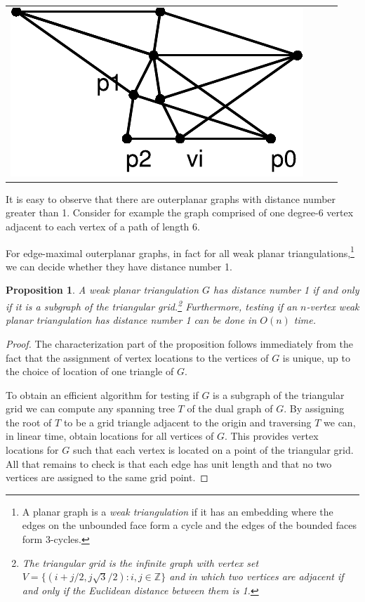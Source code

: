 \documentclass{article}
\newtheorem{prop}{Proposition}
\begin{document}
{{\begin{tabular}{cccc}
\includegraphics[scale=.30]{no2-4} 
\end{tabular}

It is easy to observe that there are outerplanar graphs with distance
number greater than 1.  Consider for example the graph comprised of
one degree-6 vertex adjacent to each vertex of a path of length 6. 
}

For edge-maximal outerplanar graphs, in fact for all weak planar
triangulations,\footnote{A planar graph is a \emph{weak triangulation}
if it has an embedding where the edges on the unbounded face form a
cycle and the edges of the bounded faces form 3-cycles.} we can decide
whether they have distance number 1.

\begin{prop} 
A weak planar triangulation $G$ has distance number 1 if and only if
it is a subgraph of the triangular grid.\footnote{The triangular grid
is the infinite graph with vertex set $V=\{(i+j/2,j\sqrt{3}/2):
i,j\in\mathbb{Z}\}$ and in which two vertices are adjacent if and only
if the Euclidean distance between them is 1.\label{fna}}  Furthermore,
testing if an $n$-vertex weak planar triangulation has distance number
1 can be done in $O(n)$ time.  
\end{prop}

\begin{proof}
The characterization part of the proposition follows immediately from
the fact that the assignment of vertex locations to the vertices of
$G$ is unique, up to the choice of location of one triangle of $G$.

To obtain an efficient algorithm for testing if $G$ is a subgraph of
the triangular grid  we can compute any spanning tree $T$ of the dual
graph of $G$. By assigning the root of $T$ to be a grid triangle
adjacent to the origin and traversing $T$ we can, in linear time,
obtain locations for all vertices of $G$.  This provides vertex
locations for $G$ such that each vertex is located on a point of the
triangular grid.  All that remains to check is that each edge has unit
length and that no two vertices are assigned to the same grid point.


\end{proof}}
\end{document}
